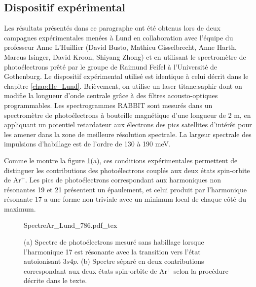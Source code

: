 \subsection{Dispositif expérimental}
Les résultats présentés dans ce paragraphe ont été obtenus lors de deux campagnes expérimentales menées à Lund en collaboration avec l'équipe du professeur Anne L'Huillier (David Busto, Mathieu Gisselbrecht, Anne Harth, Marcus Isinger, David Kroon, Shiyang Zhong) et en utilisant le spectromètre de photoélectrons prêté par le groupe de Raimund Feifel à l'Université de Gothenburg. Le dispositif expérimental utilisé est identique à celui décrit dans le chapitre \ref{chap:He_Lund}. Brièvement, on utilise un laser titane:saphir dont on modifie la longueur d'onde centrale grâce à des filtres acousto-optiques programmables. Les spectrogrammes RABBIT sont mesurés dans un spectromètre de photoélectrons à bouteille magnétique d'une longueur de 2 m, en appliquant un potentiel retardateur aux électrons des pics satellites d'intérêt pour les amener dans la zone de meilleure résolution spectrale. La largeur spectrale des impulsions d'habillage est de l'ordre de 130 à 190 meV. 

Comme le montre la figure \ref{fig:SpectreAr_Lund_786}(a), ces conditions expérimentales permettent de distinguer les contributions des photoélectrons couplés aux deux états spin-orbite de Ar$^+$. Les pics de photoélectrons correspondant aux harmoniques non résonantes 19 et 21 présentent un épaulement, et celui produit par l'harmonique résonante 17 a une forme non triviale avec un minimum local de chaque côté du maximum. 

\begin{figure}
\centering
\def\svgwidth{1\textwidth}
{SpectreAr_Lund_786.pdf_tex}
\caption{(a) Spectre de photoélectrons mesuré sans habillage lorsque l'harmonique 17 est résonante avec la transition vers l'état autoionisant $3s4p$. (b) Spectre séparé en deux contributions correspondant aux deux états spin-orbite de Ar$^+$ selon la procédure décrite dans le texte.}
\label{fig:SpectreAr_Lund_786}
\end{figure}

